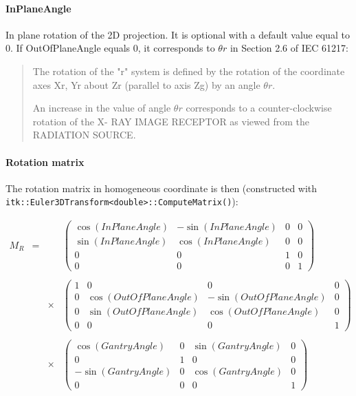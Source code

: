 \documentclass{article}
\newcommand{\biec}{\begin{quote}\begin{small}}
\newcommand{\eiec}{\end{small}\end{quote}}
\begin{document}
\paragraph{InPlaneAngle} 

In plane rotation of the 2D projection. It is optional with a default value equal to 0. If OutOfPlaneAngle equals 0, it corresponds to $\theta r$ in Section 2.6 of IEC 61217:


\biec
The rotation of the "r" system is defined by the rotation of the coordinate axes Xr, Yr about Zr (parallel to axis Zg) by an angle $\theta r$.

An increase in the value of angle $\theta r$ corresponds to a counter-clockwise rotation of the X- RAY IMAGE RECEPTOR as viewed from the RADIATION SOURCE.
\eiec

\paragraph{Rotation matrix}

The rotation matrix in homogeneous coordinate is then (constructed with\\ \verb+itk::Euler3DTransform<double>::ComputeMatrix()+):

$$
\begin{array}{lcll}
  M_R & = & & %
  \begin{pmatrix}
    \cos(InPlaneAngle) & -\sin(InPlaneAngle) & 0 & 0\\
    \sin(InPlaneAngle) & \cos(InPlaneAngle) & 0 & 0\\
    0 & 0 & 1 & 0\\
    0 & 0 & 0 & 1
  \end{pmatrix} \\
  \\ & & \times & %
  \begin{pmatrix}
    1 & 0 & 0 & 0\\
    0 & \cos(OutOfPlaneAngle) & -\sin(OutOfPlaneAngle) & 0\\
    0 & \sin(OutOfPlaneAngle) & \cos(OutOfPlaneAngle) & 0\\
    0 & 0 & 0 & 1 
  \end{pmatrix} \\
  \\ & & \times & %
  \begin{pmatrix}
    \cos(GantryAngle) & 0 & \sin(GantryAngle) & 0 \\
    0 & 1 & 0 & 0 \\
    -\sin(GantryAngle) & 0 & \cos(GantryAngle) & 0 \\
    0 & 0 & 0 & 1
  \end{pmatrix}
\end{array}
$$
\end{document}
